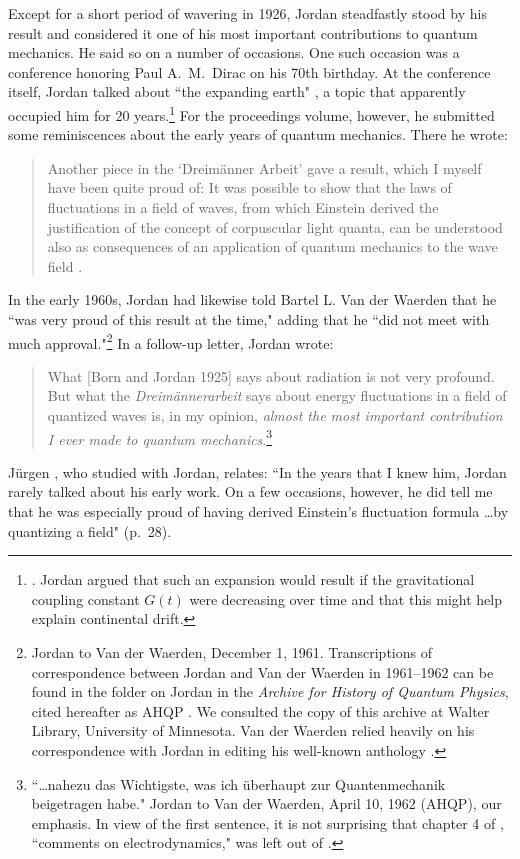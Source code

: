 \documentclass[12pt]{elsart}
\begin{document}
Except for a short period of wavering in 1926, Jordan steadfastly stood by his result and considered it one of his most important contributions to quantum mechanics. He said so on a number of occasions. One such occasion was  a conference honoring Paul A.\ M.\ Dirac on his 70th birthday. At the conference itself, Jordan talked about ``the expanding earth" \citep[p.\ 822]{Mehra 1973}, a topic that apparently occupied him for 20 years.\footnote{\citep[p.\ 124]{Kundt 2007}. Jordan argued that such an expansion would result if the gravitational coupling constant $G(t)$ were decreasing over time and that this might help explain continental drift.}
For the proceedings volume, however, he submitted some reminiscences about the early years of quantum mechanics. There he wrote: 
\begin{quotation}
Another piece in the `Dreim\"anner Arbeit' gave a result, which I myself have been quite proud of: It was possible to show that the laws of fluctuations in a field of waves, from which Einstein derived the justification of the concept of corpuscular light quanta, can be understood also as consequences of an application of quantum mechanics to the wave field \citep[p.\ 296]{Jordan 1973}.
\end{quotation}
In the early 1960s, Jordan had likewise told  Bartel L. Van der Waerden that he ``was very proud of this result at the time," adding that he ``did not meet with much approval."\footnote{\label{letter120161}Jordan to Van der Waerden, December 1, 1961. Transcriptions of correspondence between Jordan and Van der Waerden in 1961--1962 can be found in the folder on Jordan in the {\it Archive for History of Quantum Physics}, cited hereafter as AHQP \citep{Kuhn et al. 1967}. We consulted the copy of this archive at Walter Library, University of Minnesota. Van der Waerden relied heavily on his correspondence with Jordan in editing his well-known anthology \citep{Van der Waerden}.} In a follow-up letter, Jordan wrote:
\begin{quotation}
What [Born and Jordan 1925]  says about radiation is not very profound. But what the {\it Dreim\"annerarbeit} says about energy fluctuations in a field of quantized waves is, in my opinion, {\it almost the most important contribution I ever made to quantum mechanics}.\footnote{\label{letter041062}``\ldots nahezu das Wichtigste, was ich \"uberhaupt zur Quantenmechanik beigetragen habe." Jordan to Van der Waerden, April 10, 1962 (AHQP), our emphasis. In view of the first sentence, it is not surprising that  chapter 4 of \citep{Born and Jordan 1925}, ``comments on electrodynamics," was left out of \citep{Van der Waerden}.}
\end{quotation}
J\"urgen \citet{Ehlers 2007}, who studied with Jordan, relates: ``In the years that I knew him, Jordan rarely talked about his early work. On a few occasions, however, he did tell me that he was especially proud of having derived Einstein's fluctuation formula \ldots by quantizing a field" (p.\ 28).
\end{document}
